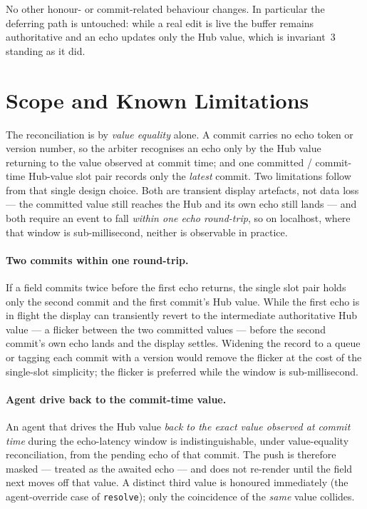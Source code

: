 \documentclass[a4paper,10pt,fleqn]{article}
\begin{document}
No other honour- or commit-related behaviour changes.  In particular the
deferring path is untouched: while a real edit is live the buffer remains
authoritative and an echo updates only the Hub value, which is invariant~3
standing as it did.

\section{Scope and Known Limitations}
\label{sec:scope}

The reconciliation is by \emph{value equality} alone.  A commit carries no echo
token or version number, so the arbiter recognises an echo only by the Hub value
returning to the value observed at commit time; and one committed / commit-time
Hub-value slot pair records only the \emph{latest} commit.  Two limitations
follow from that single design choice.  Both are transient display artefacts, not
data loss --- the committed value still reaches the Hub and its own echo still
lands --- and both require an event to fall \emph{within one echo round-trip}, so
on localhost, where that window is sub-millisecond, neither is observable in
practice.

\paragraph{Two commits within one round-trip.}
If a field commits twice before the first echo returns, the single slot pair
holds only the second commit and the first commit's Hub value.  While the first
echo is in flight the display can transiently revert to the intermediate
authoritative Hub value --- a flicker between the two committed values --- before
the second commit's own echo lands and the display settles.  Widening the record
to a queue or tagging each commit with a version would remove the flicker at the
cost of the single-slot simplicity; the flicker is preferred while the window is
sub-millisecond.

\paragraph{Agent drive back to the commit-time value.}
An agent that drives the Hub value \emph{back to the exact value observed at
commit time} during the echo-latency window is indistinguishable, under
value-equality reconciliation, from the pending echo of that commit.  The push is
therefore masked --- treated as the awaited echo --- and does not re-render until
the field next moves off that value.  A distinct third value is honoured
immediately (the agent-override case of \texttt{resolve}); only the coincidence
of the \emph{same} value collides.
\end{document}
